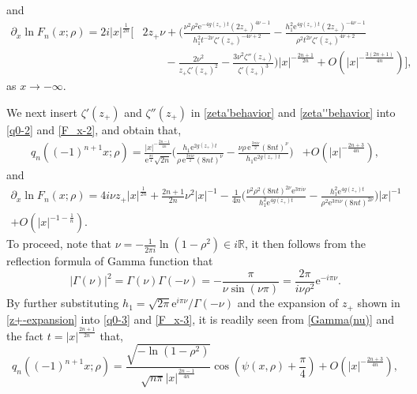 \documentclass[11pt,a4paper]{article}
\numberwithin{equation}{section}
\begin{document}
and
\begin{align}\label{F_x-2}
\partial_x\ln{F}_n(x;\rho)=2i|x|^{\frac{1}{2n}}
\Bigg[&2z_+\nu+\Bigg(
\frac{\nu^2\rho^2\mathrm{e}^{-4g(z_+)t}(2z_+)^{4\nu-1}}{h_1^2t^{-2\nu}\zeta'(z_+)^{-4\nu+2}}
-\frac{h_1^2\mathrm{e}^{4g(z_+)t}(2z_+)^{-4\nu-1}}{\rho^2t^{2\nu}\zeta'(z_+)^{4\nu+2}}
\nonumber\\
&\qquad-\frac{2\nu^2}{z_+\zeta'(z_+)^2}-\frac{3\nu^2\zeta''(z_+)}{\zeta'(z_+)^3}
\Bigg)|x|^{-\frac{2n+1}{2n}}+O\left(|x|^{-\frac{3(2n+1)}{4n}}\right)\Bigg],
\end{align}
as $x\to-\infty$.

We next insert $\zeta'(z_+)$ and $\zeta''(z_+)$ in \eqref{zeta'behavior} and \eqref{zeta''behavior} into \eqref{q0-2} and \eqref{F_x-2}, and obtain that,
\begin{align}\label{q0-3}
q_n\left((-1)^{n+1}x;\rho\right)=\frac{|x|^{-\frac{2n-1}{4n}}}{\mathrm{e}^{\frac{\pi i}{4}}\sqrt{2n}}\Bigg(\frac{h_1\mathrm{e}^{2g(z_+)t}}
{\rho\,\mathrm{e}^{\frac{3\pi i\nu}{2}}(8nt)^{\nu}}
-\frac{\nu\rho\,\mathrm{e}^{\frac{3\pi i\nu}{2}}(8nt)^{\nu}}
{h_1\mathrm{e}^{2g(z_+)t}}
\Bigg)&+O\left(|x|^{-\frac{2n+3}{4n}}\right),
\end{align}
and
\begin{multline}\label{F_x-3}
\partial_x\ln{F}_n(x;\rho)=4i\nu z_+|x|^{\frac{1}{2n}}+\frac{2n+1}{2n}\nu^2|x|^{-1}
-\frac{1}{4n}\Bigg(
\frac{\nu^2\rho^2(8nt)^{2\nu}\mathrm{e}^{3\pi i\nu}}{h_1^2\mathrm{e}^{4g(z_+)t}}
-\frac{h_1^2\mathrm{e}^{4g(z_+)t}}{\rho^2\mathrm{e}^{3\pi i\nu}(8nt)^{2\nu}}\Bigg)|x|^{-1}
\\
+O\left(|x|^{-1-\frac{1}{n}}\right).
\end{multline}
To proceed, note that $\nu=-\frac{1}{2\pi i}\ln(1-\rho^2)\in{i}\mathbb{R}$, it then follows from the reflection formula of Gamma function that
\begin{equation}\label{Gamma(nu)}
|\Gamma(\nu)|^2=\Gamma(\nu)\Gamma(-\nu)=-\frac{\pi}{\nu\sin(\nu\pi)}
=\frac{2\pi}{i\nu\rho^2}\mathrm{e}^{-i\pi\nu}.
\end{equation}
By further substituting $h_1=\sqrt{2\pi}\mathrm{e}^{i\pi\nu}/\Gamma(-\nu)$ and the expansion of $z_+$ shown in \eqref{z+-expansion} into \eqref{q0-3} and \eqref{F_x-3}, it is readily seen from \eqref{Gamma(nu)} and the fact $t=|x|^{\frac{2n+1}{2n}}$ that,
\begin{equation}\label{q0-4}
q_n\left((-1)^{n+1}x;\rho\right)=\frac{\sqrt{-\ln(1-\rho^2)}}{\sqrt{n\pi}|x|^{\frac{2n-1}{4n}}}
\cos\left(\psi(x,\rho)+\frac{\pi}{4}\right)
+O\left(|x|^{-\frac{2n+3}{4n}}\right),
\end{equation}
\end{document}
